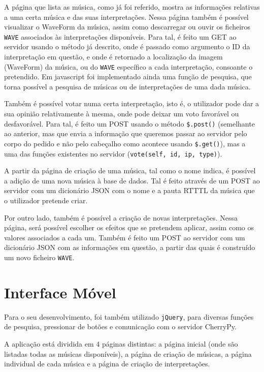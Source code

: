 \documentclass[a4paper,11pt,openright,oneside]{report}
\begin{document}
A página que lista as música, como já foi referido, mostra as informações relativas a uma certa música e das suas interpretações. Nessa página também é possível visualizar o WaveForm da música, assim como descarregar ou ouvir os ficheiros \verb|WAVE| associados às interpretações disponíveis. Para tal, é feito um GET ao servidor usando o método já descrito, onde é passado como argumento o ID da interpretação em questão, e onde é retornado a localização da imagem (WaveForm) da música, ou do \verb|WAVE| específico a cada interpretação, consoante o pretendido. Em javascript foi implementado ainda uma função de pesquisa, que torna possível a pesquisa de músicas ou de interpretações de uma dada música.

Também é possível votar numa certa interpretação, isto é, o utilizador pode dar a sua opinião relativamente à mesma, onde pode deixar um voto favorável ou desfavorável. Para tal, é feito um POST usando o método \texttt{\$.post()} (semelhante ao anterior, mas que envia a informação que queremos passar ao servidor pelo corpo do pedido e não pelo cabeçalho como acontece usando \texttt{\$.get()}), mas a uma das funções existentes no servidor (\texttt{vote(self, id, ip, type)}).

A partir da página de criação de uma música, tal como o nome indica, é possível a adição de uma nova música à base de dados. Tal é feito através de um POST ao servidor com um dicionário JSON com o nome e a pauta RTTTL da música que o utilizador pretende criar.

Por outro lado, também é possível a criação de novas interpretações. Nessa página, será possível escolher os efeitos que se pretendem aplicar, assim como os valores associados a cada um. Também é feito um POST ao servidor com um dicionário JSON com as informações em questão, a partir das quais é construído um novo ficheiro \verb|WAVE|.

\section{Interface Móvel}
\label{sec.mobile}
Para o seu desenvolvimento, foi também utilizado \verb|jQuery|, para diversas funções de pesquisa, pressionar de botões e comunicação com o servidor CherryPy.

A aplicação está dividida em 4 páginas distintas: a página inicial (onde são listadas todas as músicas disponíveis), a página de criação de músicas, a página individual de cada música e a página de criação de interpretações.
\end{document}
